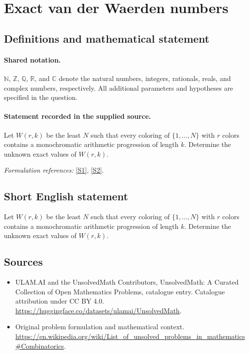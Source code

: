\documentclass[11pt]{article}
\newcommand{\sref}[2]{\hyperlink{source:#1:#2}{[S#2]}}
\begin{document}
\section{Exact van der Waerden numbers}\label{statement}

\subsection{Definitions and mathematical statement}

\paragraph{Shared notation.}$\mathbb N$, $\mathbb Z$, $\mathbb Q$, $\mathbb R$, and $\mathbb C$ denote the natural numbers, integers, rationals, reals, and complex numbers, respectively. All additional parameters and hypotheses are specified in the question.


\paragraph{Statement recorded in the supplied source.}
Let $W(r,k)$ be the least $N$ such that every coloring of $\{1,\ldots,N\}$ with $r$ colors contains a monochromatic arithmetic progression of length $k$. Determine the unknown exact values of $W(r,k)$.
\par\smallskip\textit{Formulation references:} \sref{statement}{1}, \sref{statement}{2}.
\subsection{Short English statement}
Let $W(r,k)$ be the least $N$ such that every coloring of $\{1,\ldots,N\}$ with $r$ colors contains a monochromatic arithmetic progression of length $k$. Determine the unknown exact values of $W(r,k)$.
\subsection{Sources}
\begin{itemize}
\item[\hypertarget{source:statement:1}{S1}] ULAM.AI and the UnsolvedMath Contributors, UnsolvedMath: A Curated Collection of Open Mathematics Problems, catalogue entry. Catalogue attribution under CC BY 4.0.
\url{https://huggingface.co/datasets/ulamai/UnsolvedMath}.
\item[\hypertarget{source:statement:2}{S2}] Original problem formulation and mathematical context.
\url{https://en.wikipedia.org/wiki/List_of_unsolved_problems_in_mathematics#Combinatorics}.
\end{itemize}
\label{end:statement}
\end{document}
